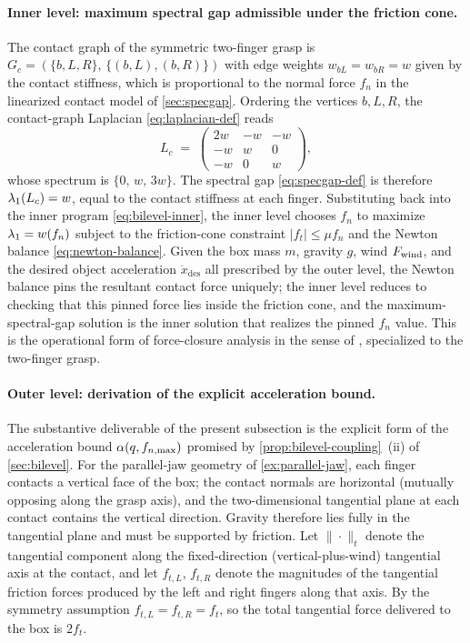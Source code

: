 \paragraph{Inner level: maximum spectral gap admissible under
the friction cone.}
The contact graph of the symmetric two-finger grasp is
$G_{c} = (\{b, L, R\},\, \{(b, L), (b, R)\})$ with edge weights
$w_{bL} = w_{bR} = w$ given by the contact stiffness, which is
proportional to the normal force $f_{n}$ in the linearized
contact model of \cref{sec:specgap}. Ordering the vertices
$b, L, R$, the contact-graph Laplacian
\eqref{eq:laplacian-def} reads
\begin{equation}
\label{eq:two-finger-L}
  L_{c} \;=\;
  \begin{pmatrix}
    2 w & -w & -w \\
    -w & w & 0 \\
    -w & 0 & w
  \end{pmatrix},
\end{equation}
whose spectrum is $\{0,\, w,\, 3 w\}$. The spectral gap
\eqref{eq:specgap-def} is therefore
$\lambda_{1}(L_{c}) = w$, equal to the contact stiffness at each
finger. Substituting back into the inner program
\eqref{eq:bilevel-inner}, the inner level chooses $f_{n}$ to
maximize $\lambda_{1} = w(f_{n})$ subject to the friction-cone
constraint $|f_{t}| \le \mu f_{n}$ and the Newton balance
\eqref{eq:newton-balance}. Given the box mass $m$, gravity
$g$, wind $F_{\mathrm{wind}}$, and the desired object acceleration
$\ddot{x}_{\mathrm{des}}$ all prescribed by the outer level, the
Newton balance pins the resultant contact force uniquely; the
inner level reduces to checking that this pinned force lies
inside the friction cone, and the maximum-spectral-gap solution
is the inner solution that realizes the pinned $f_{n}$ value.
This is the operational form of force-closure analysis in the
sense of \citet{MurrayLiSastry1994}, specialized to the
two-finger grasp.

\paragraph{Outer level: derivation of the explicit
acceleration bound.}
The substantive deliverable of the present subsection is the
explicit form of the acceleration bound
$\alpha(q, f_{n,\max})$ promised by
\cref{prop:bilevel-coupling}~(ii) of \cref{sec:bilevel}.
For the parallel-jaw geometry of \cref{ex:parallel-jaw}, each
finger contacts a vertical face of the box; the contact normals
are horizontal (mutually opposing along the grasp axis), and the
two-dimensional tangential plane at each contact contains the
vertical direction. Gravity therefore lies fully in the
tangential plane and must be supported by friction. Let
$\|\cdot\|_{t}$ denote the tangential component along the
fixed-direction (vertical-plus-wind) tangential axis at the
contact, and let $f_{t,L}$, $f_{t,R}$ denote the magnitudes of
the tangential friction forces produced by the left and right
fingers along that axis. By the symmetry assumption
$f_{t,L} = f_{t,R} = f_{t}$, so the total tangential force
delivered to the box is $2 f_{t}$.

